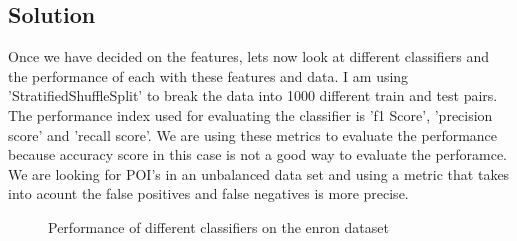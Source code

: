 \documentclass[12pt]{article}%
\begin{document}
\subsection*{Solution}

Once we have decided on the features, lets now look at different classifiers and the performance of each with these features and data. I am using 'StratifiedShuffleSplit' to break the data into 1000 different train and test pairs. The performance index used for evaluating the classifier is 'f1 Score', 'precision score' and 'recall score'. We are using these metrics to evaluate the performance because accuracy score in this case is not a good way to evaluate the perforamce. We are looking for POI's in an unbalanced data set and using a metric that takes into acount the false positives and false negatives is more precise.

\begin{figure}[!htbp]
\centering
  \hfill
  \caption{Performance of different classifiers on the enron dataset}
\end{figure}
\end{document}
